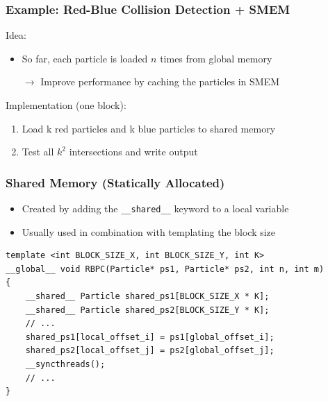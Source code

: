 \documentclass[aspectratio=169,handout]{beamer}
\begin{document}
\begin{frame}[fragile]
\frametitle{Example: Red-Blue Collision Detection + SMEM}
Idea:
\begin{itemize}
	\item So far, each particle is loaded $n$ times from global memory
	\item[$\rightarrow$] Improve performance by caching the particles in SMEM
\end{itemize}
Implementation (one block):
\begin{enumerate}
	\item Load k red particles and k blue particles to shared memory
	\item Test all $k^2$ intersections and write output
\end{enumerate}
\end{frame}

\begin{frame}[fragile]
\frametitle{Shared Memory (Statically Allocated)}
\begin{itemize}
	\item Created by adding the \texttt{\_\_shared\_\_} keyword to a local variable
	\item Usually used in combination with templating the block size
\end{itemize}
\begin{lstlisting}
template <int BLOCK_SIZE_X, int BLOCK_SIZE_Y, int K>
__global__ void RBPC(Particle* ps1, Particle* ps2, int n, int m)
{
    __shared__ Particle shared_ps1[BLOCK_SIZE_X * K];
    __shared__ Particle shared_ps2[BLOCK_SIZE_Y * K];
    // ...
    shared_ps1[local_offset_i] = ps1[global_offset_i];
    shared_ps2[local_offset_j] = ps2[global_offset_j];
    __syncthreads();
    // ...
}
\end{lstlisting}
\end{frame}


\end{document}
